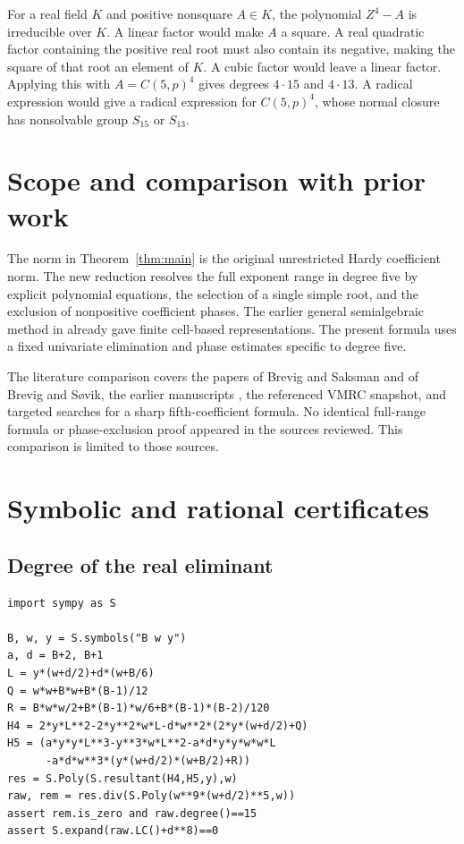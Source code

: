 \documentclass[11pt]{article}
\begin{document}
For a real field \(K\) and positive nonsquare \(A\in K\), the
polynomial \(Z^4-A\) is irreducible over \(K\). A linear factor
would make \(A\) a square. A real quadratic factor containing
the positive real root must also contain its negative,
making the square of that root an element of \(K\). A cubic
factor would leave a linear factor. Applying this with
\(A=C(5,p)^4\) gives degrees \(4\cdot15\) and \(4\cdot13\).
A radical expression would give a radical expression for
\(C(5,p)^4\), whose normal closure has nonsolvable group
\(S_{15}\) or \(S_{13}\).

\section{Scope and comparison with prior work}

The norm in Theorem~\ref{thm:main} is the original unrestricted
Hardy coefficient norm. The new reduction resolves the full exponent
range in degree five by explicit polynomial equations, the selection of a single
simple root, and the exclusion of nonpositive coefficient phases. The earlier general semialgebraic method in \cite{Low}
already gave finite cell-based representations. The present formula
uses a fixed univariate elimination and phase estimates specific
to degree five.

The literature comparison covers the papers of Brevig and Saksman
and of Brevig and S{\o}vik, the earlier manuscripts \cite{Low,High},
the referenced VMRC snapshot, and targeted searches for a sharp
fifth-coefficient formula. No identical full-range formula or
phase-exclusion proof appeared in the sources reviewed. This
comparison is limited to those sources.

\appendix
\section{Symbolic and rational certificates}
\subsection{Degree of the real eliminant}
\begin{verbatim}
import sympy as S

B, w, y = S.symbols("B w y")
a, d = B+2, B+1
L = y*(w+d/2)+d*(w+B/6)
Q = w*w+B*w+B*(B-1)/12
R = B*w*w/2+B*(B-1)*w/6+B*(B-1)*(B-2)/120
H4 = 2*y*L**2-2*y**2*w*L-d*w**2*(2*y*(w+d/2)+Q)
H5 = (a*y*y*L**3-y**3*w*L**2-a*d*y*y*w*w*L
      -a*d*w**3*(y*(w+d/2)*(w+B/2)+R))
res = S.Poly(S.resultant(H4,H5,y),w)
raw, rem = res.div(S.Poly(w**9*(w+d/2)**5,w))
assert rem.is_zero and raw.degree()==15
assert S.expand(raw.LC()+d**8)==0
\end{verbatim}
\end{document}
